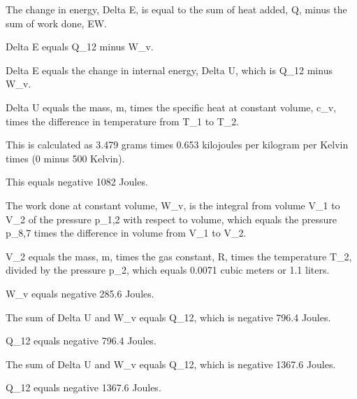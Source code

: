 The change in energy, Delta E, is equal to the sum of heat added, Q, minus the sum of work done, EW.

Delta E equals Q_12 minus W_v.

Delta E equals the change in internal energy, Delta U, which is Q_12 minus W_v.

Delta U equals the mass, m, times the specific heat at constant volume, c_v, times the difference in temperature from T_1 to T_2.

This is calculated as 3.479 grams times 0.653 kilojoules per kilogram per Kelvin times (0 minus 500 Kelvin).

This equals negative 1082 Joules.

The work done at constant volume, W_v, is the integral from volume V_1 to V_2 of the pressure p_1,2 with respect to volume, which equals the pressure p_8,7 times the difference in volume from V_1 to V_2.

V_2 equals the mass, m, times the gas constant, R, times the temperature T_2, divided by the pressure p_2, which equals 0.0071 cubic meters or 1.1 liters.

W_v equals negative 285.6 Joules.

The sum of Delta U and W_v equals Q_12, which is negative 796.4 Joules.

Q_12 equals negative 796.4 Joules.

The sum of Delta U and W_v equals Q_12, which is negative 1367.6 Joules.

Q_12 equals negative 1367.6 Joules.